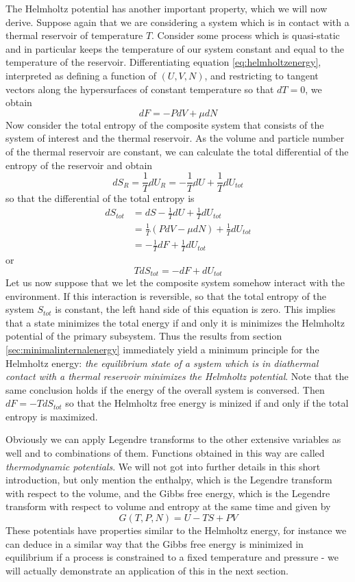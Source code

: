 \documentclass[a4paper, draft]{article}
\theoremstyle{own}
\theoremstyle{remark}
\begin{document}
The Helmholtz potential has another important property, which we will now derive. Suppose again that we are considering a system which is in contact with a thermal reservoir of temperature $T$. Consider some process which is quasi-static and in particular keeps the temperature of our system constant and equal to the temperature of the reservoir. Differentiating equation \ref{eq:helmholtzenergy}, interpreted as defining a function of $(U,V,N)$, and restricting to tangent vectors along the hypersurfaces of constant temperature so that $dT = 0$, we obtain
$$
dF = - P dV + \mu dN
$$
Now consider the total entropy of the composite system that consists of the system of interest and the thermal reservoir. As the volume and particle number of the thermal reservoir are constant, we can calculate the 
total differential of the entropy of the reservoir and obtain
$$
d S_R = \frac{1}{T} dU_R = - \frac{1}{T} dU + \frac{1}{T} dU_{tot}
$$
so that the differential of the total entropy is
\begin{align*}
d S_{tot} &= dS - \frac{1}{T} dU + \frac{1}{T} dU_{tot} \\
& = \frac{1}{T} (P dV - \mu dN) + \frac{1}{T} dU_{tot} \\ 
&= - \frac{1}{T} dF + \frac{1}{T} dU_{tot}
\end{align*}
or
$$
T dS_{tot} = - dF + dU_{tot}
$$
Let us now suppose that we let the composite system somehow interact with the environment. If this interaction is reversible, so that the total entropy of the system $S_{tot}$ is constant, the left hand side of this equation is zero. This implies that a state minimizes the total energy if and only it is minimizes the Helmholtz potential of the primary subsystem. Thus the results from section \ref{sec:minimalinternalenergy} immediately yield a minimum principle for the Helmholtz energy: {\em the equilibrium state of a system which is in diathermal contact with a thermal reservoir minimizes the Helmholtz potential}. Note that the same conclusion holds if the energy of the overall system is conversed. Then $dF = - T dS_{tot}$ so that the Helmholtz free energy is minized if and only if the total entropy is maximized.


Obviously we can apply Legendre transforms to the other extensive variables as well and to combinations of them. Functions obtained in this way are called {\em thermodynamic potentials}. We will not got into further details in this short introduction, but only mention the enthalpy, which is the Legendre transform with respect to the volume, and the Gibbs free energy, which is the Legendre transform with respect to volume and entropy at the same time and given by
$$
G(T, P, N) = U - TS + PV
$$
These potentials have properties similar to the Helmholtz energy, for instance we can deduce in a similar way that the Gibbs free energy is minimized in equilibrium if a process is constrained to a fixed temperature and pressure - we will actually demonstrate an application of this in the next section.
\end{document}
